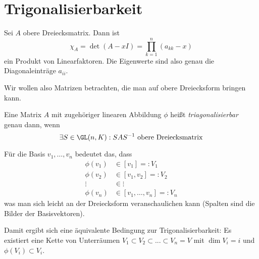 \documentclass{mycourse}
\begin{document}
\section{Trigonalisierbarkeit}


\begin{ex}
Sei $A$ obere Dreiecksmatrix.
Dann ist
\[
\chi_A = \det(A-xI) = \prod_{k=1}^n(a_{kk}-x)
\]
ein Produkt von Linearfaktoren.
Die Eigenwerte sind also genau die Diagonaleinträge $a_{ii}$.
\end{ex}

Wir wollen also Matrizen betrachten, die man auf obere Dreiecksform bringen kann.

\begin{df}
\label{df:11.4}
Eine Matrix $A$ mit zugehöriger linearen Abbildung $\phi$ heißt \emph{triagonalisierbar} genau dann, wenn
\[
\exists S\in \GL(n, K): SAS^{-1} \text{ obere Dreiecksmatrix}
\]
\end{df}

Für die Basis $v_1,\dotsc,v_n$ bedeutet das, dass
\begin{align*}
\phi(v_1)&\in[v_1]=:V_1\\
\phi(v_2)&\in[v_1,v_2] =:V_2\\
\vdots &\in \vdots\\
\phi(v_n)&\in[v_1,\dotsc,v_n]=:V_n
\end{align*}
was man sich leicht an der Dreiecksform veranschaulichen kann (Spalten sind die Bilder der Basisvektoren).

Damit ergibt sich eine äquivalente Bedingung zur Trigonalisierbarkeit: 
Es existiert eine Kette von Unterräumen
$ V_1 \subset V_2 \subset ... \subset V_n=V $
mit $\dim V_i=i$ und $\phi(V_i)\subset V_i$.
\end{document}
